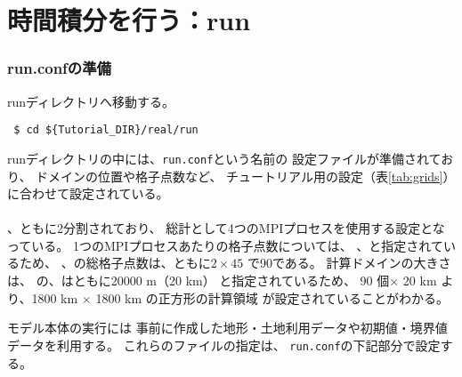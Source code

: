 \section{時間積分を行う：run}
\label{sec:tutrial_real_run}
\subsubsection{run.confの準備}
runディレクトリへ移動する。
\begin{verbatim}
 $ cd ${Tutorial_DIR}/real/run
\end{verbatim}
%
runディレクトリの中には、\verb|run.conf|という名前の
設定ファイルが準備されており、
ドメインの位置や格子点数など、
チュートリアル用の設定（表\ref{tab:grids}）に合わせて設定されている。\\

\\


{\XDIR} 、{\YDIR}ともに2分割されており、
総計として4つのMPIプロセスを使用する設定となっている。
1つのMPIプロセスあたりの格子点数については、
、と指定されているため、
{\XDIR} 、{\YDIR}の総格子点数は、ともに$2 \times 45$ で90である。
計算ドメインの大きさは、
の、はともに20000 m（20 km）
と指定されているため、
90 個$\times$ 20 km より、1800 km $\times$ 1800 km の正方形の計算領域
が設定されていることがわかる。


モデル本体の実行には
事前に作成した地形・土地利用データや初期値・境界値データを利用する。
これらのファイルの指定は、
\verb|run.conf|の下記部分で設定する。\\


